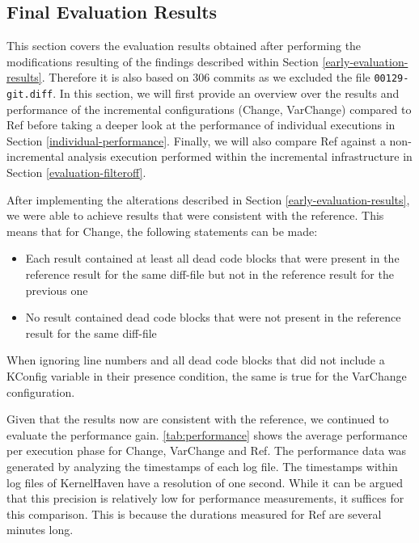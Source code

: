 \documentclass[a4paper]{article}
\begin{document}
\subsection{Final Evaluation Results} \label{final-evaluation}

This section covers the evaluation results obtained after performing the modifications resulting of the findings described within Section \ref{early-evaluation-results}. Therefore it is also based on 306 commits as we excluded the file \texttt{00129-git.diff}. In this section, we will first provide an overview over the results and performance of the incremental configurations (Change, VarChange) compared to Ref before taking a deeper look at the performance of individual executions in Section \ref{individual-performance}. Finally, we will also compare Ref against a non-incremental analysis execution performed within the incremental infrastructure in Section \ref{evaluation-filteroff}. 

After implementing the alterations described in Section \ref{early-evaluation-results}, we were able to achieve results that were consistent with the reference. This means that for Change, the following statements can be made:

\begin{itemize}
   \item Each result contained at least all dead code blocks that were present in the reference result for the same diff-file but not in the reference result for the previous one
   \item No result contained dead code blocks that were not present in the reference result for the same diff-file
\end{itemize}

When ignoring line numbers and all dead code blocks that did not include a KConfig variable in their presence condition, the same is true for the VarChange configuration. 

Given that the results now are consistent with the reference, we continued to evaluate the performance gain. \autoref{tab:performance} shows the average performance per execution phase for Change, VarChange and  Ref. The performance data was generated by analyzing the timestamps of each log file. The timestamps within log files of KernelHaven have a resolution of one second. While it can be argued that this precision is relatively low for performance measurements, it suffices for this comparison. This is because the durations measured for Ref are several minutes long.
\end{document}
